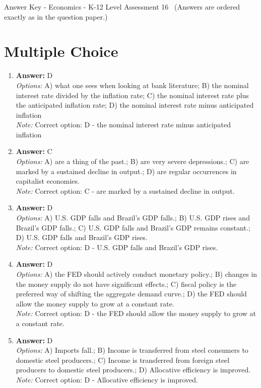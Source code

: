 \documentclass[12pt]{article}
\begin{document}
\begin{center}
Answer Key - Economics - K-12 Level Assessment 16 \
\small (Answers are ordered exactly as in the question paper.)
\end{center}

\section*{Multiple Choice}
\begin{enumerate}[label=\arabic*.]
\item \textbf{Answer:} D
\\ \textit{Options:} A) what one sees when looking at bank literature; B) the nominal interest rate divided by the inflation rate; C) the nominal interest rate plus the anticipated inflation rate; D) the nominal interest rate minus anticipated inflation
\\ \textit{Note:} Correct option: D - the nominal interest rate minus anticipated inflation
\item \textbf{Answer:} C
\\ \textit{Options:} A) are a thing of the past.; B) are very severe depressions.; C) are marked by a sustained decline in output.; D) are regular occurrences in capitalist economies.
\\ \textit{Note:} Correct option: C - are marked by a sustained decline in output.
\item \textbf{Answer:} D
\\ \textit{Options:} A) U.S. GDP falls and Brazil's GDP falls.; B) U.S. GDP rises and Brazil's GDP falls.; C) U.S. GDP falls and Brazil's GDP remains constant.; D) U.S. GDP falls and Brazil's GDP rises.
\\ \textit{Note:} Correct option: D - U.S. GDP falls and Brazil's GDP rises.
\item \textbf{Answer:} D
\\ \textit{Options:} A) the FED should actively conduct monetary policy.; B) changes in the money supply do not have significant effects.; C) fiscal policy is the preferred way of shifting the aggregate demand curve.; D) the FED should allow the money supply to grow at a constant rate.
\\ \textit{Note:} Correct option: D - the FED should allow the money supply to grow at a constant rate.
\item \textbf{Answer:} D
\\ \textit{Options:} A) Imports fall.; B) Income is transferred from steel consumers to domestic steel producers.; C) Income is transferred from foreign steel producers to domestic steel producers.; D) Allocative efficiency is improved.
\\ \textit{Note:} Correct option: D - Allocative efficiency is improved.
\end{enumerate}
\end{document}
